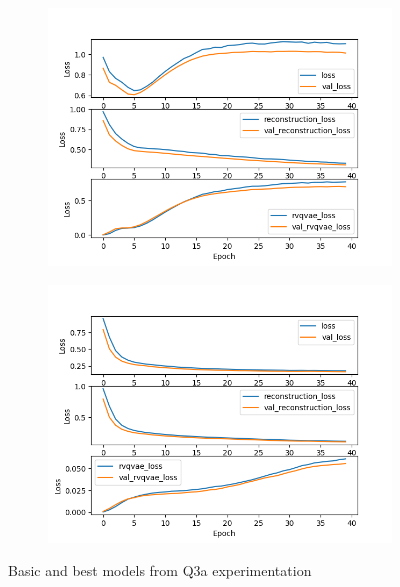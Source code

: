 \documentclass[11pt,a4paper]{article}
\begin{document}
\begin{figure}[h]
    \centering
    \begin{subfigure}[b]{0.47\textwidth}
        \includegraphics[width = \textwidth]{../figures/model_1_training.png} 
        \label{fig:model_1}
    \end{subfigure}
        \hfill
    \begin{subfigure}[b]{0.47\textwidth}
        \includegraphics[width = \textwidth]{../figures/model_5_training.png} 
        \label{fig:model_5}
    \end{subfigure}
    \caption{Basic and best models from Q3a experimentation}
\end{figure}
\end{document}

